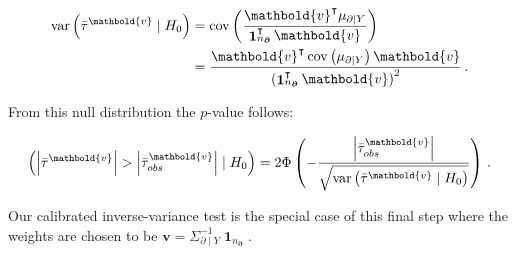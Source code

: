 \documentclass[letter]{article}
\newcommand{\genericdel}[3]{%
      \left#1#3\right#2
    }
\newcommand{\del}[1]{\genericdel(){#1}}
\let\Pr\relax
\DeclareMathOperator{\Pr}{\mathbb{P}}
\DeclareMathOperator{\cov}{{cov}}
\DeclareMathOperator{\var}{{var}}
\newcommand{\abs}[1]{\genericdel||{#1}}
\DeclareMathOperator{\ones}{\mathbf{1}}
\newcommand{\trans}{^{\intercal}}
\newcommand{\vvec}{\mathbold{v}}
\newcommand{\boundary}{\partial}
\newcommand{\sentinels}{\bm{\boundary}}
\begin{document}
\begin{equation}
\begin{aligned}
    \var\del{\bar{\tau}^\vvec \mid H_0} &= \cov\del{ \frac{\vvec \trans \mu_{\boundary \mid Y}}{\ones_{n_{\sentinels}}\trans \vvec}} \\
    &= \frac{\vvec \trans \cov \del{\mu_{\boundary \mid Y}} \vvec}{\del{\ones_{n_{\sentinels}}\trans \vvec}^2}
    \,.
\end{aligned}
\end{equation}
    


    	From this null distribution the \(p\)-value follows:

\begin{equation}
    \Pr\del{ \abs{\bar{\tau}^\vvec} > \abs{\bar{\tau}_{obs}^\vvec} \mid H_0} = 2 \Phi\del{ -\frac{\abs{\bar{\tau}_{obs}^\vvec}}{\sqrt{\var\del{\bar{\tau}^\vvec \mid H_0}}} }\,.
\end{equation}

Our calibrated inverse-variance test is the special case of this final step where the weights are chosen to be \(\vvec = \Sigma^{-1}_{\boundary \mid Y} \ones_{n_{\sentinels}}\).
    



    
    
	
	

    
    
\end{document}
